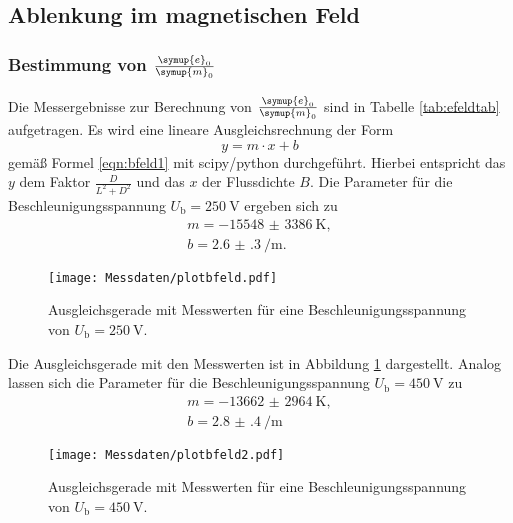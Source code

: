 
\FloatBarrier
\subsection{Ablenkung im magnetischen Feld}

\subsubsection{Bestimmung von $\frac{\symup{e}_0}{\symup{m}_0}$}
Die Messergebnisse zur Berechnung von $\frac{\symup{e}_0}{\symup{m}_0}$ sind in Tabelle
\ref{tab:efeldtab} aufgetragen. Es wird eine lineare Ausgleichsrechnung der Form
\begin{equation*}
	y = m \cdot x + b
\end{equation*}
gemäß Formel \eqref{eqn:bfeld1} mit scipy/python \cite{scipy} durchgeführt. Hierbei entspricht das
$y$ dem Faktor $\frac{D}{L^2+D^2}$ und das $x$ der Flussdichte $B$.
Die Parameter für die Beschleunigungsspannung $U_{\mathrm{b}}=\SI{250}{\volt}$ ergeben sich zu
\begin{gather*}
	m = -\SI{15548(3386)}{\kelvin} \mathrm{,} \\
	b = \SI{2.6(3)}{\per\meter} \mathrm{.}
\end{gather*}
\begin{figure}
  \centering
  \texttt{[image: Messdaten/plotbfeld.pdf]}
  \caption{Ausgleichsgerade mit Messwerten für eine Beschleunigungsspannung von $U_{\mathrm{b}}=\SI{250}{\volt}$.}
  \label{fig:bfeldplot}
\end{figure}
Die Ausgleichsgerade mit den Messwerten ist in Abbildung \ref{fig:bfeldplot} dargestellt.
Analog lassen sich die Parameter für die Beschleunigungsspannung $U_{\mathrm{b}}=\SI{450}{\volt}$
zu
\begin{gather*}
	m = -\SI{13662(2964)}{\kelvin} \mathrm{,} \\
	b = \SI{2.8(4)}{\per\meter}
\end{gather*}
\begin{figure}
  \centering
  \texttt{[image: Messdaten/plotbfeld2.pdf]}
  \caption{Ausgleichsgerade mit Messwerten für eine Beschleunigungsspannung von $U_{\mathrm{b}}=\SI{450}{\volt}$.}
  \label{fig:bfeldplot2}
\end{figure}
